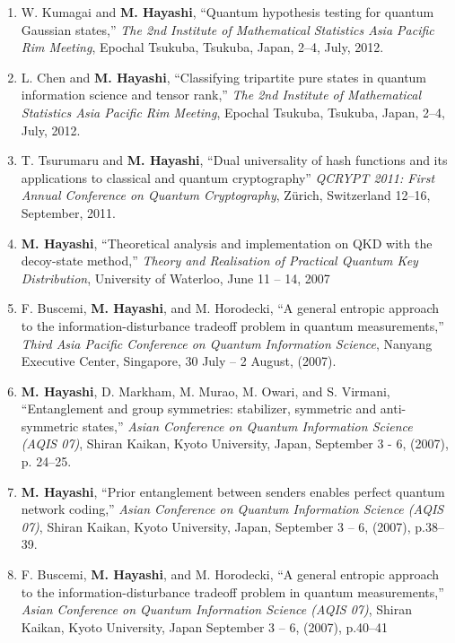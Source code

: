 \documentclass[a4paper,12pt,oneside]{article}
\begin{document}
\begin{enumerate}
\item 
W. Kumagai and \textbf{M. Hayashi}, 
``Quantum hypothesis testing for quantum Gaussian states,'' 
{\em The 2nd Institute of Mathematical Statistics Asia Pacific Rim Meeting}, 
Epochal Tsukuba, Tsukuba, Japan, 2--4, July, 2012.

\item 
L. Chen and \textbf{M. Hayashi}, 
``Classifying tripartite pure states in quantum information science and tensor rank,'' 
{\em The 2nd Institute of Mathematical Statistics Asia Pacific Rim Meeting}, 
Epochal Tsukuba, Tsukuba, Japan, 2--4, July, 2012.

\item 
T. Tsurumaru and \textbf{M. Hayashi}, ``Dual universality of hash functions and its applications to classical and quantum cryptography'' 
{\em QCRYPT 2011: First Annual Conference on Quantum Cryptography}, 
Z\"{u}rich, Switzerland 12--16, September, 2011.

\item
\textbf{M. Hayashi}, ``Theoretical analysis and implementation on QKD with the decoy-state method,'' 
{\em Theory and Realisation of Practical Quantum Key Distribution}, 
University of Waterloo, June 11 -- 14, 2007

\item
F. Buscemi, \textbf{M. Hayashi}, and M. Horodecki, ``A general entropic approach to the information-disturbance tradeoff problem in quantum measurements,'' 
{\em Third Asia Pacific Conference on Quantum Information Science}, 
Nanyang Executive Center, Singapore, 
30 July -- 2 August, (2007).

\item
\textbf{M. Hayashi}, D. Markham, M. Murao, M. Owari, and S. Virmani, ``Entanglement and group symmetries: stabilizer, symmetric and anti-symmetric states,'' 
{\em Asian Conference on Quantum Information Science (AQIS 07)}, 
Shiran Kaikan, Kyoto University, Japan, September 3 - 6, (2007), p. 24--25.

\item
\textbf{M. Hayashi}, ``Prior entanglement between senders enables perfect quantum network coding,'' {\em Asian Conference on Quantum Information Science (AQIS 07)}, 
Shiran Kaikan, Kyoto University, Japan, 
September 3 -- 6, (2007), p.38--39.

\item
F. Buscemi, \textbf{M. Hayashi}, and M. Horodecki, ``A general entropic approach to the information-disturbance tradeoff problem in quantum measurements,'' 
{\em Asian Conference on Quantum Information Science (AQIS 07)}, 
Shiran Kaikan, Kyoto University, Japan September 3 -- 6, (2007), p.40--41


\end{enumerate}
\end{document}

